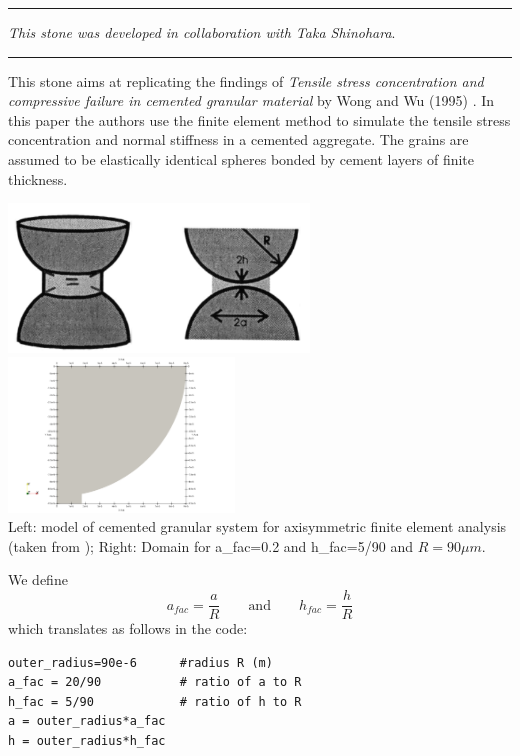 

\par\noindent\rule{\textwidth}{0.4pt}

{\sl This stone was developed in collaboration with Taka Shinohara}.

\par\noindent\rule{\textwidth}{0.4pt}


This stone aims at replicating the findings of 
{\sl Tensile stress concentration and compressive failure in cemented
granular material} by Wong and Wu (1995) \cite{wowu95}.
In this paper the authors use the finite element method to simulate 
the tensile stress concentration and normal stiffness in a cemented
aggregate. The grains are assumed to be elastically identical spheres
bonded by cement layers of finite thickness.


\begin{center}
\includegraphics[width=8cm]{python_codes/fieldstone_63/images/yoyo}
\includegraphics[width=6cm]{python_codes/fieldstone_63/images/domain}\\
{\captionfont Left: model of cemented granular system for 
axisymmetric finite element analysis (taken from \cite{wowu95}); Right: 
Domain for a\_fac=0.2 and h\_fac=5/90 and $R=90\mu m$.}
\end{center}

We define
\[
a_{fac} = \frac{a}{R}  
\qquad
\text{and}
\qquad 
h_{fac} = \frac{h}{R}
\]
which translates as follows in the code:
\begin{lstlisting}
outer_radius=90e-6      #radius R (m)  
a_fac = 20/90           # ratio of a to R 
h_fac = 5/90            # ratio of h to R
a = outer_radius*a_fac
h = outer_radius*h_fac
\end{lstlisting}

